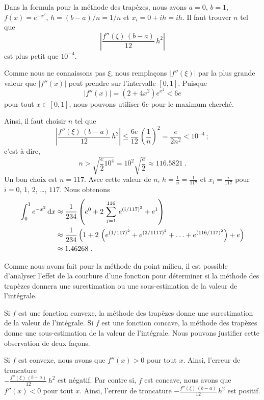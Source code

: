{\begin{egg}
Dans la formula pour la méthode des trapèzes, nous avons $a=0$, $b=1$,
$f(x) = e^{-x^2}$, $h= (b-a)/n = 1/n$ et $x_i = 0 +i h = ih$.  Il faut
trouver $n$ tel que
\[
\left| \frac{f''(\xi)\,(b-a)}{12}\,h^2 \right|
\]
est plus petit que $10^{-4}$.

Comme nous ne connaissons pas $\xi$, nous remplaçons $|f''(\xi)|$ par la plus
grande valeur que $|f''(x)|$ peut prendre sur l'intervalle $[0,1]$.
Puisque
\[
|f''(x)| = (2+4x^2)e^{x^2} < 6e
\]
pour tout $x\in [0,1]$, nous pouvons utiliser $6e$ pour le maximum
cherché.

Ainsi, il faut choisir $n$ tel que
\[
\left| \frac{f''(\xi)\,(b-a)}{12}\,h^2 \right|
\leq \frac{6e}{12}\, \left(\frac{1}{n}\right)^2 
= \frac{e}{2n^2} < 10^{-4} \, ;
\]
c'est-à-dire,
\[
n > \sqrt{ \frac{e}{2} 10^4} = 10^2 \sqrt{\frac{e}{2}} \approx
116.5821 \ .
\]
Un bon choix est $n=117$.  Avec cette valeur de $n$, 
$\displaystyle h = \frac{1}{n} = \frac{1}{117}$ et
$x_i = \frac{i}{117}$ pour $i=0$, $1$, $2$, \ldots, $117$.  Nous obtenons
\begin{align*}
\int_0^1 e^{-x^2}\,\mathrm{d}x & \approx \frac{1}{234} \left(
e^0 + 2\,\sum_{j=1}^{116}\, e^{(i/117)^2} + e^1 \right) \\
&\approx \frac{1}{234} \left( 1 + 2\,\left(e^{(1/117)^2} +
e^{(2/1117)^2} + \ldots + e^{(116/117)^2}\right) + e \right) \\
&\approx 1.46268 \ .
\end{align*}
\end{egg}

\begin{rmk}
Comme nous avons fait pour la méthode du point milieu, il est possible
d'analyser l'effet de la courbure d'une fonction pour déterminer si
la méthode des trapèzes donnera une surestimation ou une
sous-estimation de la valeur de l'intégrale.

Si $f$ est une fonction convexe, la méthode des trapèzes donne
une surestimation de la valeur de l'intégrale.  Si $f$ est une
fonction concave, la méthode des trapèzes donne une sous-estimation de
la valeur de l'intégrale.  Nous pouvons justifier cette observation de deux
façons.

Si $f$ est convexe, nous avons que $f''(x) >0$ pour tout $x$.  Ainsi,
l'erreur de troncature\\
$\displaystyle -\frac{f''(\xi)\,(b-a)}{12}\,h^2$ est
négatif.  Par contre si, $f$ est concave, nous avons que $f''(x) <0$
pour tout $x$.  Ainsi, l'erreur de troncature
$\displaystyle -\frac{f''(\xi)\,(b-a)}{12}\,h^2$ est positif.


\end{rmk}}
